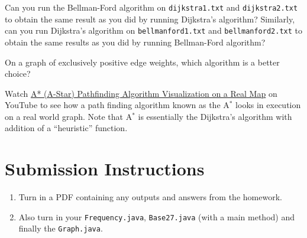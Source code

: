 \documentclass{homework}
\begin{document}
\question Can you run the Bellman-Ford algorithm on
\texttt{dijkstra1.txt} and \texttt{dijkstra2.txt} to obtain the same
result as you did by running Dijkstra's algorithm? Similarly, can you
run Dijkstra's algorithm on \texttt{bellmanford1.txt} and
\texttt{bellmanford2.txt} to obtain the same results as you did by
running Bellman-Ford algorithm?

\question On a graph of exclusively positive edge weights, which
algorithm is a better choice?

\question Watch \href{https://www.youtube.com/watch?v=CgW0HPHqFE8}{A*
  (A-Star) Pathfinding Algorithm Visualization on a Real Map} on
YouTube to see how a path finding algorithm known as the A$^*$ looks
in execution on a real world graph. Note that A$^*$ is essentially the
Dijkstra's algorithm with addition of a ``heuristic'' function.

\section*{Submission Instructions}

\begin{enumerate}
    \item Turn in a PDF containing any outputs and answers from the homework.
    \item Also turn in your \texttt{Frequency.java},
    \texttt{Base27.java} (with a main method) and finally the
    \texttt{Graph.java}.
\end{enumerate}
\end{document}
